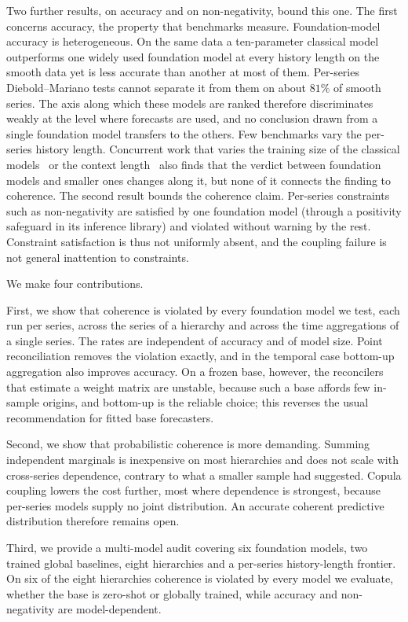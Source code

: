 \documentclass[review,number]{elsarticle}
\begin{document}
Two further results, on accuracy and on non-negativity, bound this one. The first
concerns accuracy, the property that benchmarks measure. Foundation-model accuracy is
heterogeneous. On the same data a
ten-parameter classical model outperforms one widely used foundation model at every
history length on the smooth data yet is less accurate than another at most of
them. Per-series Diebold--Mariano tests cannot separate it
from them on about $81\%$ of smooth series. The axis along which these models are
ranked therefore discriminates weakly at the level where forecasts are used, and no
conclusion drawn from a single foundation model transfers to the others. Few benchmarks
vary the per-series history length. Concurrent work that varies the training
size of the classical models~\citep{breakeven2026} or the context
length~\citep{quitobench2026,energyload2026} also finds that the verdict between
foundation models and smaller ones changes along it, but none of it connects the
finding to coherence. The second result bounds the
coherence claim. Per-series constraints such as non-negativity are satisfied by
one foundation model (through a positivity safeguard in its inference library) and violated without
warning by the rest. Constraint satisfaction is thus not uniformly absent, and the
coupling failure is not general inattention to constraints.

We make four contributions.

First, we show that coherence is violated by every foundation model we test, each run
per series, across the series of a hierarchy and across the time aggregations of a single
series. The rates are independent of accuracy and of model size. Point reconciliation
removes the violation exactly, and in the temporal case bottom-up aggregation also
improves accuracy. On a frozen base, however, the reconcilers that estimate a weight
matrix are unstable, because such a base affords few in-sample origins, and bottom-up
is the reliable choice; this reverses the usual recommendation for fitted base
forecasters.

Second, we show that probabilistic coherence is more demanding. Summing independent marginals is
inexpensive on most hierarchies and does not scale with cross-series dependence,
contrary to what a smaller sample had suggested. Copula coupling lowers the cost further, most where
dependence is strongest, because per-series models supply no joint distribution.
An accurate coherent predictive distribution therefore remains open.

Third, we provide a multi-model audit covering six foundation models, two trained global
baselines, eight hierarchies and a per-series history-length frontier. On six of the
eight hierarchies coherence is violated by every model we evaluate, whether the
base is zero-shot or globally trained, while accuracy and non-negativity are
model-dependent.
\end{document}
